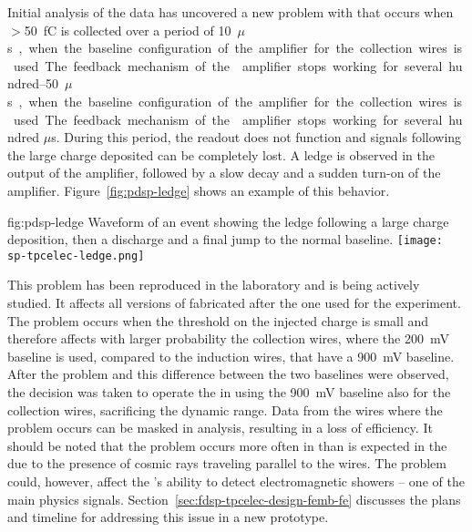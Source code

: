 Initial analysis of the  data has uncovered a new problem with  
that occurs when $>$\SI{50}{fC} is collected over a period of \SIrange{10}{50}{$\mu$s}, 
when the baseline configuration of the amplifier for the collection wires is used. 
The feedback mechanism of the  amplifier stops working for several 
hundred $\mu$s. During this period, the readout does not function and signals 
following the large charge deposited can be completely lost. A ledge is observed 
in the output of the  amplifier, followed by a slow decay 
and a sudden turn-on of the amplifier.
Figure~\ref{fig:pdsp-ledge} shows an example of this behavior.

\begin{dunefigure}
{fig:pdsp-ledge}
{Waveform of an event showing the ledge following a large charge 
deposition, then a discharge and a final jump to the normal baseline.}
\texttt{[image: sp-tpcelec-ledge.png]}
\end{dunefigure}

This problem has been reproduced in the laboratory and is being actively 
studied. It affects all versions of  fabricated after 
the one used for the  experiment. The problem occurs 
when the threshold on the injected charge is small and therefore affects
with larger probability the collection wires, where the \SI{200}{mV} baseline 
is used, compared to the induction wires, that have a \SI{900}{mV} baseline.
After the problem and this difference between the two baselines were 
observed, the decision was taken to operate the  in  
using the \SI{900}{mV} baseline also for the collection wires, sacrificing
the dynamic range. Data from the wires where the problem occurs can
be masked in analysis, resulting in a loss of efficiency. It should be
noted that the problem occurs more often in  %
than is expected in the    due to the presence of cosmic rays traveling parallel
to the  wires. %
The problem %
could, however, affect the 's ability to detect
electromagnetic showers -- one of the main physics signals.
Section~\ref{sec:fdsp-tpcelec-design-femb-fe} discusses the plans and timeline for addressing this issue in a new  prototype.

